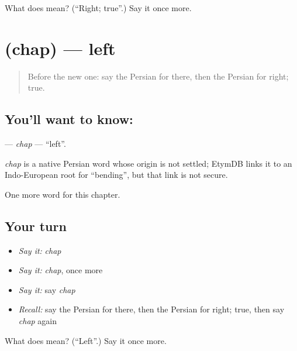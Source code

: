 \begin{tcolorbox}[breakable,colback=teal!4,colframe=teal!35!black,title={Before you move on}]
What does  mean? (\textquotedblleft{}Right; true\textquotedblright{}.) Say it once more.
\end{tcolorbox}
\section[\texorpdfstring{\fa{چپ} (chap)}{چپ (chap)}]{ (chap) — left}

\label{lesson:FA-C69-chap}



\begin{quote}
Before the new one: say the Persian for there, then the Persian for right; true.
\end{quote}

\subsection*{You'll want to know: }
\textbf{} — \emph{chap} — \textquotedblleft{}left\textquotedblright{}.

\begin{cousinweb}
\emph{chap} is a native Persian word whose origin is not settled; EtymDB links it to an Indo-European root for \textquotedblleft{}bending\textquotedblright{}, but that link is not secure.
\end{cousinweb}

\begin{grammarlens}[title={What you've built}]
One more word for this chapter.
\end{grammarlens}

\subsection*{Your turn}
\begin{itemize}
\raggedright
  \item \emph{Say it:} \emph{chap}
  \item \emph{Say it:} \emph{chap}, once more
  \item \emph{Say it:} say \emph{chap}
  \item \emph{Recall:} say the Persian for there, then the Persian for right; true, then say \emph{chap} again
\end{itemize}

\begin{tcolorbox}[breakable,colback=teal!4,colframe=teal!35!black,title={Before you move on}]
What does  mean? (\textquotedblleft{}Left\textquotedblright{}.) Say it once more.
\end{tcolorbox}
